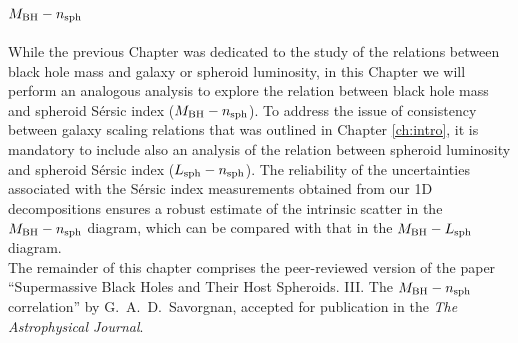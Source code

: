 \chapter{$M_{\rm BH} - n_{\rm sph}$}
\label{ch:mn}

While the previous Chapter was dedicated to the study of the relations between 
black hole mass and galaxy or spheroid luminosity, 
in this Chapter we will perform an analogous analysis 
to explore the relation between black hole mass and spheroid S\'ersic index ($M_{\rm BH} - n_{\rm sph}$). 
To address the issue of consistency between galaxy scaling relations 
that was outlined in Chapter \ref{ch:intro}, 
it is mandatory to include also an analysis of the relation between spheroid luminosity 
and spheroid S\'ersic index ($L_{\rm sph} - n_{\rm sph}$). 
The reliability of the uncertainties associated with the S\'ersic index measurements 
obtained from our 1D decompositions 
ensures a robust estimate of the intrinsic scatter in the $M_{\rm BH} - n_{\rm sph}$ diagram, 
which can be compared with that in the $M_{\rm BH} - L_{\rm sph}$ diagram. \\

The remainder of this chapter comprises the peer-reviewed version of the paper 
``Supermassive Black Holes and Their Host Spheroids. 
III. The $M_{\rm BH} - n_{\rm sph}$ correlation'' 
by G.~A.~D.~Savorgnan,  
accepted for publication in the \emph{The Astrophysical Journal}. 




